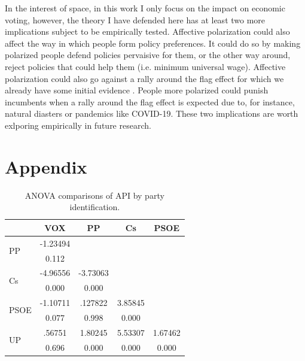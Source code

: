 \documentclass[a4paper, svgnames]{article}
\begin{document}
In the interest of space, in this work I only focus on the impact on economic voting, however, the theory I have defended here has at least two more implications subject to be empirically tested. Affective polarization could also affect the way in which people form policy preferences. It could do so by making polarized people defend policies pervaisive for them, or the other way around, reject policies that could help them (i.e. minimum universal wage). Affective polarization could also go against a rally around the flag effect for which we already have some initial evidence \citep*{Giommoni2020}. People more polarized could punish incumbents when a rally around the flag effect is expected due to, for instance, natural diasters or pandemics like COVID-19. These two implications are worth exlporing empirically in future research. 


\newpage




\newpage

\section{Appendix}
\label{appendix}
\begin{table}[H]
	\centering
	\caption{ANOVA comparisons of API by party identification.}
	\label{tab:anova-parties}
	\begin{tabular}{@{}lcccc@{}}
		\toprule
		                      & VOX      & PP       & Cs      & PSOE    \\ \midrule
		\multirow{2}{*}{PP}   & -1.23494 &          &         &         \\
		                      & 0.112    &          &         &         \\
		\multirow{2}{*}{Cs}   & -4.96556 & -3.73063 &         &         \\
		                      & 0.000    & 0.000    &         &         \\
		\multirow{2}{*}{PSOE} & -1.10711 & .127822  & 3.85845 &         \\
		                      & 0.077    & 0.998    & 0.000   &         \\
		\multirow{2}{*}{UP}   & .56751   & 1.80245  & 5.53307 & 1.67462 \\
		                      & 0.696    & 0.000    & 0.000   & 0.000   \\ \bottomrule
	\end{tabular}
\end{table}
\end{document}

